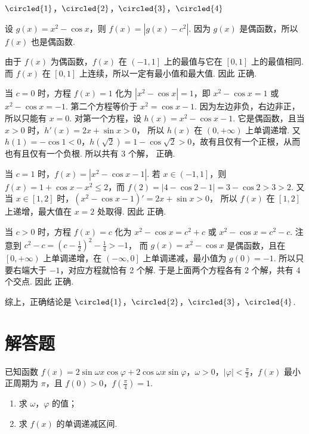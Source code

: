 \begin{answer}
\(\circled{1}\)，\(\circled{2}\)，\(\circled{3}\)，\(\circled{4}\)
\end{answer}

\begin{solution}
设 \( g(x)=x^2-\cos x \)，则 \( f(x)=\left| g(x)-c^2 \right| \). 因为 \( g(x) \) 是偶函数，所以 \( f(x) \) 也是偶函数.

 由于 \( f(x) \) 为偶函数，\( f(x) \) 在 \( \left( -1,1 \right] \) 上的最值与它在 \( \left[ 0,1 \right] \) 上的最值相同. 而 \( f(x) \) 在 \( \left[ 0,1 \right] \) 上连续，所以一定有最小值和最大值. 因此  正确.

 当 \( c=0 \) 时，方程 \( f(x)=1 \) 化为 \( \left| x^2-\cos x \right|=1 \)，即 \( x^2-\cos x=1 \) 或 \( x^2-\cos x=-1 \).
第二个方程等价于 \( x^2=\cos x-1 \). 因为左边非负，右边非正，所以只能有 \( x=0 \).
对第一个方程，设 \( h(x)=x^2-\cos x-1 \). 它是偶函数，且当 \( x>0 \) 时，\( h'\left( x \right)=2x+\sin x>0 \)，
所以 \( h(x) \) 在 \( \left( 0,+\infty \right) \) 上单调递增. 又 \( h(1)=-\cos 1<0 \)，\( h\left( \sqrt{2} \right)=1-\cos \sqrt{2}>0 \)，故有且仅有一个正根，从而也有且仅有一个负根. 所以共有 3 个解， 正确.

 当 \( c=1 \) 时，\( f(x)=\left| x^2-\cos x-1 \right| \). 若 \( x\in \left( -1,1 \right] \)，则 \( f(x)=1+\cos x-x^2\le 2 \)，而 \( f(2)=\left| 4-\cos 2-1 \right|=3-\cos 2>3>2 \). 又当 \( x\in \left[ 1,2 \right] \) 时，\( \left( x^2-\cos x-1 \right)'=2x+\sin x>0 \)，
所以 \( f(x) \) 在 \( \left[ 1,2 \right] \) 上递增，最大值在 \( x=2 \) 处取得. 因此  正确.

 当 \( c>0 \) 时，方程 \( f(x)=c \) 化为 \( x^2-\cos x=c^2+c \) 或 \( x^2-\cos x=c^2-c \). 注意到 \( c^2-c=\left( c-\frac{1}{2} \right)^2-\frac{1}{4}>-1 \)，
而 \( g(x)=x^2-\cos x \) 是偶函数，且在 \( \left[ 0,+\infty \right) \) 上单调递增，在 \( \left( -\infty,0 \right] \) 上单调递减，最小值为 \( g(0)=-1 \). 所以只要右端大于 \( -1 \)，对应方程就恰有 2 个解. 于是上面两个方程各有 2 个解，共有 4 个交点. 因此  正确.

综上，正确结论是 \(\circled{1}\)，\(\circled{2}\)，\(\circled{3}\)，\(\circled{4}\).
\end{solution}
\section{解答题}

\begin{problem}
已知函数 \( f(x)=2\sin \omega x\cos \varphi+2\cos \omega x\sin \varphi \)，\( \omega>0 \)，\( \left| \varphi \right|<\frac{\pi}{2} \)，\( f(x) \) 最小正周期为 \( \pi \)，且 \( f(0)>0 \)，\( f\left( \frac{\pi}{4} \right)=1 \).

\begin{enumerate}
\item 求 \( \omega \)，\( \varphi \) 的值；
\item 求 \( f(x) \) 的单调递减区间.
\end{enumerate}
\end{problem}

